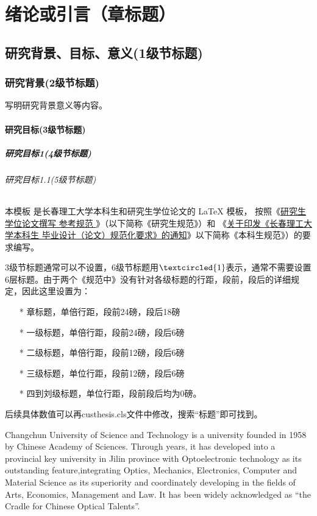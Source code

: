 
\chapter{绪论或引言（章标题）}%
\section{研究背景、目标、意义(1级节标题)}
\subsection{研究背景(2级节标题)}
写明研究背景意义等内容。
\subsubsection{研究目标(3级节标题)}
\paragraph{研究目标1(4级节标题)}
\subparagraph{研究目标1.1(5级节标题)}
本模板  是长春理工大学本科生和研究生学位论文的 \LaTeX{}
模板， 按照《\href{https://yjs.cust.edu.cn/yjspy/lwssjdb/67113.htm}
{研究生学位论文撰写
参考规范
}》（以下简称《研究生规范》）和
《\href{https://jwc.cust.edu.cn/gzzd/xfwj/76084.htm}
{关于印发《长春理工大学本科生
毕业设计（论文）规范化要求》的通知}》以下简称《本科生规范》）的要求编写。

3级节标题通常可以不设置，6级节标题用$\textcircled{1}$表示，通常不需要设置6层标题。由于两个《规范中》没有针对各级标题的行距，段前，段后的详细规定，因此这里设置为：
\begin{enumerate}
    \item [*]章标题，单倍行距，段前24磅，段后18磅
    \item [*]一级标题，单倍行距，段前24磅，段后6磅
    \item [*]二级标题，单倍行距，段前12磅，段后6磅
    \item [*]三级标题，单位行距，段前12磅，段后6磅
    \item [*]四到刘级标题，单位行距，段前段后均为0磅。
\end{enumerate}
后续具体数值可以再custhesis.cls文件中修改，搜索“标题”即可找到。

Changchun University of Science and Technology is a university founded in 1958 by Chinese Academy of Sciences. Through years, it has developed into a provincial key university in Jilin province with Optoelectronic technology as its outstanding feature,integrating Optics, Mechanics, Electronics, Computer and Material Science as its superiority and coordinately developing in the fields of Arts, Economics, Management and Law. It has been widely acknowledged as “the Cradle for Chinese Optical Talents”.

